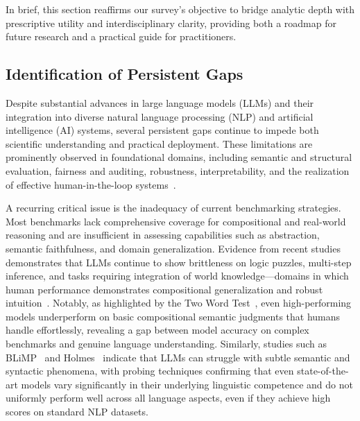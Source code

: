 \documentclass[sigconf]{acmart}
\begin{document}
In brief, this section reaffirms our survey's objective to bridge analytic depth with prescriptive utility and interdisciplinary clarity, providing both a roadmap for future research and a practical guide for practitioners.

\subsection{Identification of Persistent Gaps}

Despite substantial advances in large language models (LLMs) and their integration into diverse natural language processing (NLP) and artificial intelligence (AI) systems, several persistent gaps continue to impede both scientific understanding and practical deployment. These limitations are prominently observed in foundational domains, including semantic and structural evaluation, fairness and auditing, robustness, interpretability, and the realization of effective human-in-the-loop systems~\cite{ref2,ref7,ref10,ref12,ref13,ref15,ref16,ref17,ref18,ref19,ref20,ref22,ref24,ref25,ref26,ref28,ref30,ref31,ref32,ref33,ref34,ref36,ref37,ref38,ref39,ref42,ref43,ref44,ref46,ref47,ref48,ref49,ref50,ref52,ref53,ref54,ref55,ref56,ref57,ref58,ref59,ref60,ref66,ref67,ref68,ref69,ref70,ref76,ref77,ref78,ref79,ref80,ref86,ref87,ref88,ref89,ref90,ref91,ref92,ref93,ref94,ref95,ref96,ref97,ref98,ref99,ref100,ref101,ref102,ref103,ref104,ref105,ref106,ref107,ref108}.

A recurring critical issue is the inadequacy of current benchmarking strategies. Most benchmarks lack comprehensive coverage for compositional and real-world reasoning and are insufficient in assessing capabilities such as abstraction, semantic faithfulness, and domain generalization. Evidence from recent studies demonstrates that LLMs continue to show brittleness on logic puzzles, multi-step inference, and tasks requiring integration of world knowledge---domains in which human performance demonstrates compositional generalization and robust intuition~\cite{ref10,ref17,ref18,ref19,ref31,ref32,ref34,ref44,ref79,ref98,ref96,ref99,ref92}. Notably, as highlighted by the Two Word Test~\cite{ref96}, even high-performing models underperform on basic compositional semantic judgments that humans handle effortlessly, revealing a gap between model accuracy on complex benchmarks and genuine language understanding. Similarly, studies such as BLiMP~\cite{ref99} and Holmes~\cite{ref97} indicate that LLMs can struggle with subtle semantic and syntactic phenomena, with probing techniques confirming that even state-of-the-art models vary significantly in their underlying linguistic competence and do not uniformly perform well across all language aspects, even if they achieve high scores on standard NLP datasets.
\end{document}
